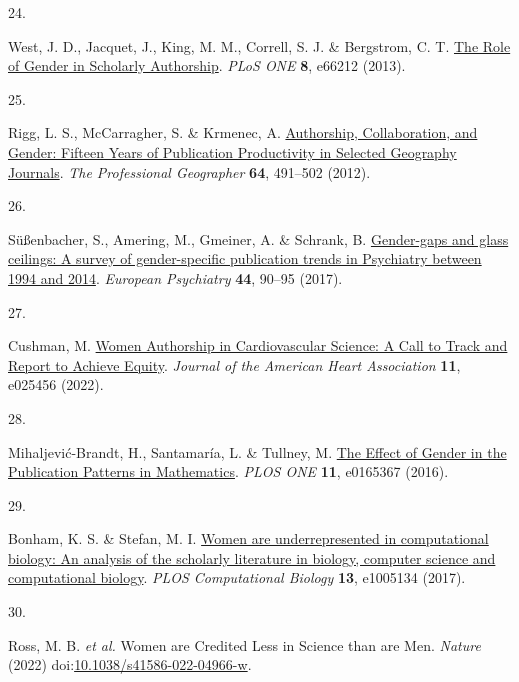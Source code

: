 \documentclass[
  man,floatsintext]{apa6}
\newlength{\cslhangindent}
\newlength{\csllabelwidth}
\newlength{\cslentryspacingunit} %
\newenvironment{CSLReferences}[2] %
 {%
  \setlength{\parindent}{0pt}
  \ifodd #1
  \let\oldpar\par
  \def\par{\hangindent=\cslhangindent\oldpar}
  \fi
  \setlength{\parskip}{#2\cslentryspacingunit}
 }%
 {}
\newcommand{\CSLLeftMargin}[1]{\parbox[t]{\csllabelwidth}{#1}}
\newcommand{\CSLRightInline}[1]{\parbox[t]{\linewidth - \csllabelwidth}{#1}\break}
\begin{document}
\begin{CSLReferences}{0}{0}
\leavevmode{}%
\CSLLeftMargin{24. }%
\CSLRightInline{West, J. D., Jacquet, J., King, M. M., Correll, S. J. \& Bergstrom, C. T. \href{https://doi.org/10.1371/journal.pone.0066212}{The Role of Gender in Scholarly Authorship}. \emph{PLoS ONE} \textbf{8}, e66212 (2013).}

\leavevmode{}%
\CSLLeftMargin{25. }%
\CSLRightInline{Rigg, L. S., McCarragher, S. \& Krmenec, A. \href{https://doi.org/10.1080/00330124.2011.611434}{Authorship, Collaboration, and Gender: Fifteen Years of Publication Productivity in Selected Geography Journals}. \emph{The Professional Geographer} \textbf{64}, 491--502 (2012).}

\leavevmode{}%
\CSLLeftMargin{26. }%
\CSLRightInline{Süßenbacher, S., Amering, M., Gmeiner, A. \& Schrank, B. \href{https://doi.org/10.1016/j.eurpsy.2017.03.008}{Gender-gaps and glass ceilings: A survey of gender-specific publication trends in Psychiatry between 1994 and 2014}. \emph{European Psychiatry} \textbf{44}, 90--95 (2017).}

\leavevmode{}%
\CSLLeftMargin{27. }%
\CSLRightInline{Cushman, M. \href{https://doi.org/10.1161/JAHA.122.025456}{Women Authorship in Cardiovascular Science: A Call to Track and Report to Achieve Equity}. \emph{Journal of the American Heart Association} \textbf{11}, e025456 (2022).}

\leavevmode{}%
\CSLLeftMargin{28. }%
\CSLRightInline{Mihaljević-Brandt, H., Santamaría, L. \& Tullney, M. \href{https://doi.org/10.1371/journal.pone.0165367}{The Effect of Gender in the Publication Patterns in Mathematics}. \emph{PLOS ONE} \textbf{11}, e0165367 (2016).}

\leavevmode{}%
\CSLLeftMargin{29. }%
\CSLRightInline{Bonham, K. S. \& Stefan, M. I. \href{https://doi.org/10.1371/journal.pcbi.1005134}{Women are underrepresented in computational biology: An analysis of the scholarly literature in biology, computer science and computational biology}. \emph{PLOS Computational Biology} \textbf{13}, e1005134 (2017).}

\leavevmode{}%
\CSLLeftMargin{30. }%
\CSLRightInline{Ross, M. B. \emph{et al.} Women are Credited Less in Science than are Men. \emph{Nature} (2022) doi:\href{https://doi.org/10.1038/s41586-022-04966-w}{10.1038/s41586-022-04966-w}.}


\end{CSLReferences}
\end{document}
